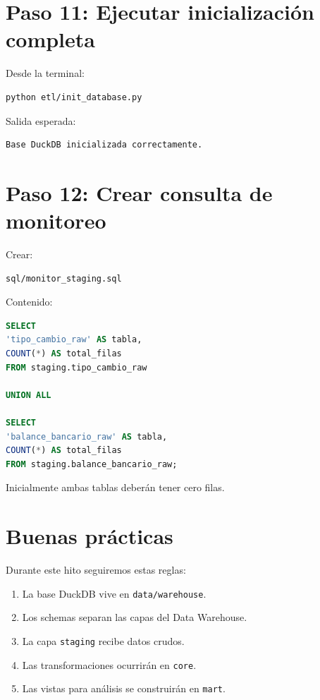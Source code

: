 \section{Paso 11: Ejecutar inicialización completa}

Desde la terminal:

\begin{lstlisting}[language=bash]
python etl/init_database.py
\end{lstlisting}

Salida esperada:

\begin{verbatim}
Base DuckDB inicializada correctamente.
\end{verbatim}

\section{Paso 12: Crear consulta de monitoreo}

Crear:

\begin{verbatim}
sql/monitor_staging.sql
\end{verbatim}

Contenido:

\begin{lstlisting}[language=SQL]
SELECT
'tipo_cambio_raw' AS tabla,
COUNT(*) AS total_filas
FROM staging.tipo_cambio_raw

UNION ALL

SELECT
'balance_bancario_raw' AS tabla,
COUNT(*) AS total_filas
FROM staging.balance_bancario_raw;
\end{lstlisting}

Inicialmente ambas tablas deberán tener cero filas.

\section{Buenas prácticas}

Durante este hito seguiremos estas reglas:

\begin{enumerate}
\item La base DuckDB vive en \texttt{data/warehouse}.
\item Los schemas separan las capas del Data Warehouse.
\item La capa \texttt{staging} recibe datos crudos.
\item Las transformaciones ocurrirán en \texttt{core}.
\item Las vistas para análisis se construirán en \texttt{mart}.
\end{enumerate}

